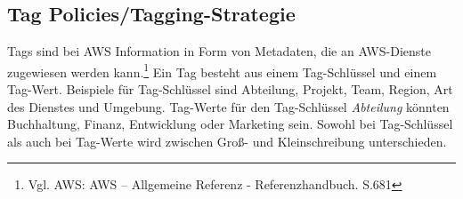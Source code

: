\newpage

\subsection*{Tag Policies/Tagging-Strategie}
%
Tags sind bei AWS Information in Form von Metadaten, die an AWS-Dienste zugewiesen werden kann.\footnote{Vgl. AWS: AWS – Allgemeine Referenz - Referenzhandbuch. S.681\cite{AMZ29}} Ein Tag besteht aus einem Tag-Schlüssel und einem Tag-Wert. Beispiele für Tag-Schlüssel sind Abteilung, Projekt, Team, Region, Art des Dienstes und Umgebung. Tag-Werte für den Tag-Schlüssel \textit{Abteilung} könnten Buchhaltung, Finanz, Entwicklung oder Marketing sein. Sowohl bei Tag-Schlüssel als auch bei Tag-Werte wird zwischen Groß- und Kleinschreibung unterschieden. 

